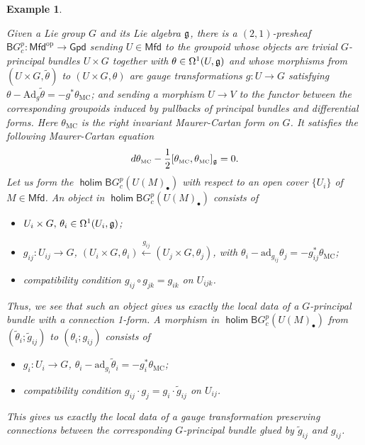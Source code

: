 \documentclass[letterpaper,10pt, oneside]{article} %
\newtheorem{ep}[thm]{Example}
\newcommand{\Mfd}{\mathsf{Mfd}}%
\newcommand{\Gpd}{\mathsf{Gpd}}%
\newcommand{\B}{\mathsf{B}}%
\DeclareMathOperator{\holim}{\mathsf{holim}}
\newcommand{\op}{\mathrm{op}}%
\newcommand{\TM}{\theta_{\scriptscriptstyle \mathrm{MC}}}
\newcommand{\half}{\frac{1}{2}}
\newcommand{\Ad}{\mathrm{Ad}}
\newcommand{\ad}{\mathrm{ad}}
\newcommand{\tg}{\widetilde{g}}
\newcommand{\ttheta}{\widetilde{\theta}}
\begin{document}
\begin{ep}\label{ep:bgconn}{\rm
Given a Lie group $G$ and its Lie algebra $\mathfrak g$, there is a $(2, 1)$-presheaf $\B G^p_{c}: \Mfd^\op \to \Gpd$
sending $U\in \Mfd$ to the groupoid whose objects are trivial $G$-principal bundles
$U\times G$ together with $\theta\in \Omega^1(U, \mathfrak g)$ and whose morphisms from $(U\times G,\ttheta)$ to $(U\times G,\theta)$ are gauge
transformations $g: U\to G$ satisfying $\theta - \Ad_g\ttheta = - g^* \TM$;  and sending a
morphism $U\to V$ to the functor between the corresponding groupoids
induced by pullbacks of principal bundles and differential forms. Here $\TM$ is the right invariant Maurer-Cartan form on $G$. It satisfies the following Maurer-Cartan equation
$$
d\TM-\half[\TM,\TM]_\g=0.
$$Let us form the $\holim
\B G^p_c(U(M)_\bullet)$ with respect to an open cover $\{ U_i\}$ of $M\in
\Mfd$. An object in $\holim
\B G^p_{c}(U(M)_\bullet)$ consists of
\begin{itemize}
\item $ U_i \times G, \, \theta_i \in \Omega^1 (U_i, \mathfrak g)$;
\item $g_{ij} : U_{ij} \to G$,   $(U_i \times G, \theta_i)
  \xleftarrow{g_{ij}} (U_j \times G, \theta_j)$, with  $\theta_i - \ad_{g_{ij}} \theta_j = - g_{ij}^* \TM$;
\item compatibility condition $g_{ij} \circ g_{jk}=g_{ik}$ on $U_{ijk}$.
\end{itemize}
Thus, we see that such an object gives us exactly the local data of a
$G$-principal bundle with a connection 1-form.
A morphism in $\holim
\B G^p_c(U(M)_\bullet)$ from $(\ttheta_i; \tg_{ij})$ to $(\theta_i; g_{ij})$ consists of
\begin{itemize}
\item $g_i : U_i \to G$, $\theta_i- \ad_{g_i}\ttheta_i = -g_i^* \TM$;
\item compatibility condition $g_{ij} \cdot g_j = g_i \cdot \tg_{ij} $ on $U_{ij}$.
\end{itemize}
This gives us exactly the local data of a gauge transformation  preserving connections between
the corresponding $G$-principal bundle glued by $\tg_{ij}$ and
$g_{ij}$.
}
 \end{ep}
\end{document}
